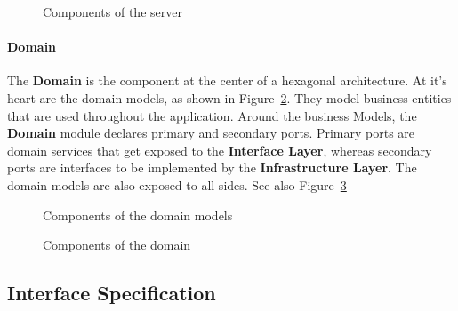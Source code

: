 \begin{figure}
    \centering
    \caption{Components of the server}
    \label{fig:component-server}
\end{figure}

\paragraph{Domain}\label{par:domain}
The \textbf{Domain} is the component at the center of a hexagonal architecture.
At it's heart are the domain models, as shown in Figure~\ref{fig:component-domain-models}.
They model business entities that are used throughout the application. \newline
Around the business Models, the \textbf{Domain} module declares primary and secondary ports.
Primary ports are domain services that get exposed to the \textbf{Interface Layer}, whereas secondary ports are interfaces to be implemented by the \textbf{Infrastructure Layer}.
The domain models are also exposed to all sides.
See also Figure~\ref{fig:component-domain}

\begin{figure}
    \centering
    \caption{Components of the domain models}
    \label{fig:component-domain-models}
\end{figure}

\begin{figure}
    \centering
    \caption{Components of the domain}
    \label{fig:component-domain}
\end{figure}

\subsection{Interface Specification}\label{subsec:interface-specification}

